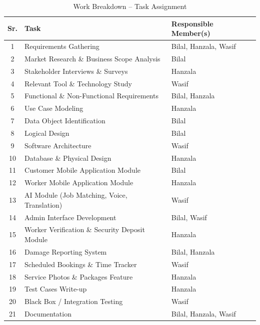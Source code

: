 \documentclass[12pt,a4paper]{report}
\begin{document}
\begin{table}[!htbp]
    \centering
    \caption{Work Breakdown -- Task Assignment}
    \label{tab:wbs}
    \vspace{0.2cm}
    \begin{tabular}{cp{7cm}l}
        \toprule
        \textbf{Sr.} & \textbf{Task} & \textbf{Responsible Member(s)} \\
        \midrule
        1  & Requirements Gathering                          & Bilal, Hanzala, Wasif \\
        2  & Market Research \& Business Scope Analysis      & Bilal \\
        3  & Stakeholder Interviews \& Surveys               & Hanzala \\
        4  & Relevant Tool \& Technology Study               & Wasif \\
        5  & Functional \& Non-Functional Requirements       & Bilal, Hanzala \\
        6  & Use Case Modeling                               & Hanzala \\
        7  & Data Object Identification                      & Bilal \\
        8  & Logical Design                                  & Bilal \\
        9  & Software Architecture                           & Wasif \\
        10 & Database \& Physical Design                     & Hanzala \\
        11 & Customer Mobile Application Module              & Bilal \\
        12 & Worker Mobile Application Module                & Hanzala \\
        13 & AI Module (Job Matching, Voice, Translation)    & Wasif \\
        14 & Admin Interface Development                     & Bilal, Wasif \\
        15 & Worker Verification \& Security Deposit Module  & Hanzala \\
        16 & Damage Reporting System                         & Bilal, Hanzala \\
        17 & Scheduled Bookings \& Time Tracker              & Wasif \\
        18 & Service Photos \& Packages Feature              & Hanzala \\
        19 & Test Cases Write-up                             & Hanzala \\
        20 & Black Box / Integration Testing                 & Wasif \\
        21 & Documentation                                   & Bilal, Hanzala, Wasif \\
        \bottomrule
    \end{tabular}
\end{table}
\end{document}
